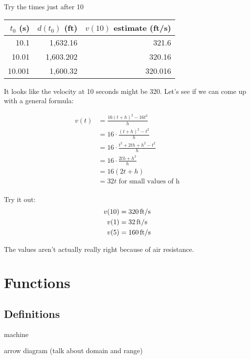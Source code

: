 \documentclass[letterpaper, landscape]{exam}
\begin{document}
  Try the times just after 10
  
  \begin{tabular}[H]{rrr}
    \toprule
    $t_0$ (s) & $d(t_0)$ (ft) & $v(10)$ estimate (ft/s) \\
    \midrule
    10.1       & 1,632.16      & 321.6 \\
    10.01      & 1,603.202     & 320.16 \\
    10.001     & 1,600.32      & 320.016 \\
    \bottomrule
  \end{tabular}

  It looks like the velocity at 10 seconds might be 320. Let's see if we can
  come up with a general formula:

  \begin{align*}
    v(t) &= \frac{16(t + h)^2 - 16t^2}{h} \\
         &= 16 \cdot \frac{(t + h)^2 - t^2}{h} \\
         &= 16 \cdot \frac{t^2 + 2th + h^2 - t^2}{h} \\
         &= 16 \cdot \frac{2th + h^2}{h} \\
         &= 16 (2t + h) \\
         &= 32t \text{ for small values of h} \\
  \end{align*}

  Try it out:
  \begin{align*}
    v(10) & = \unit[320]{ft/s} \\
    v(1)  & = \unit[32]{ft/s} \\
    v(5)  & = \unit[160]{ft/s} \\
  \end{align*}

  The values aren't actually really right because of air resistance.

  \section{Functions}

  \subsection{Definitions}
  \begin{itemize*}
    \item machine
    \item arrow diagram (talk about domain and range)
  \end{itemize*}
\end{document}
